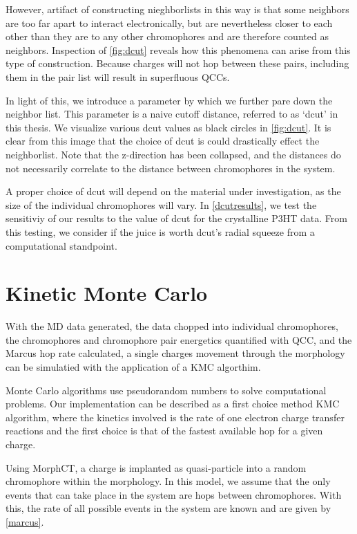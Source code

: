 However, artifact of constructing nieghborlists in this way is that some
neighbors are too far apart to interact electronically, but are nevertheless closer to each other than they
are to any other chromophores and are therefore counted as neighbors. 
Inspection of \autoref{fig:dcut} reveals how this phenomena can arise from this type of construction.
Because charges will not hop between these pairs, including them in the pair list will result in 
superfluous QCCs. 

In light of this, we introduce a parameter by which we further pare down the neighbor list. This parameter is
a naive cutoff distance, referred to as `dcut' in this thesis. We visualize various dcut values as black
circles in \autoref{fig:dcut}.
It is clear from this image that the choice of dcut is could drastically effect the
neighborlist.  
Note that the z-direction has been collapsed, and the distances do not necessarily correlate to the distance
between chromophores in the system.

A proper choice of dcut will depend on the material under investigation, 
as the size of the individual chromophores will vary. In 
\autoref{dcutresults}, we test the sensitiviy of our results to the value of dcut for the crystalline P3HT
data. From this testing, we consider if the juice is worth dcut's radial squeeze from a computational standpoint. 

\section{Kinetic Monte Carlo}
\label{KMC}

With the MD data generated, the data chopped into individual chromophores, 
the chromophores and chromophore pair energetics
quantified with QCC, and the Marcus hop rate calculated, 
a single charges movement through the morphology can be simulatied with the
application of a KMC algorthim.

Monte Carlo algorithms use pseudorandom numbers to solve computational problems. Our implementation can be
described as a first choice method KMC algorithm, where the kinetics involved is the rate of one electron
charge transfer reactions and the first choice is that of the fastest available hop for a given charge.

Using MorphCT, a charge is implanted as quasi-particle into a random chromophore within 
the morphology. In this model, we assume that the only events that can take place in the system are hops
between chromophores. With this, the rate of all possible events in the system are known and are given by
\autoref{marcus}. 

